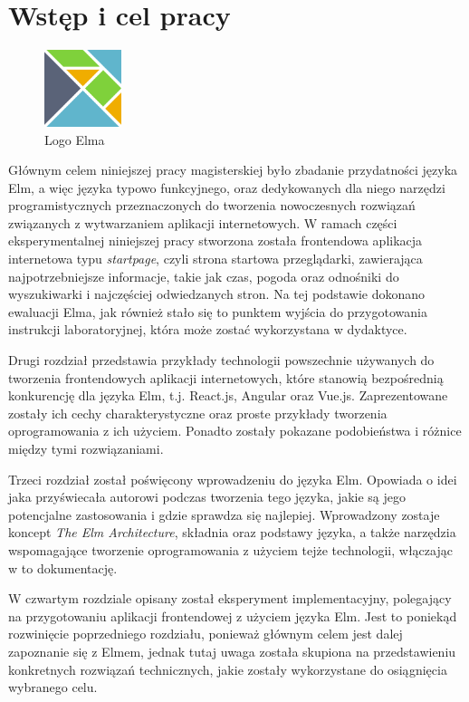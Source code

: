 \documentclass[twoside,a4paper]{report}
\begin{document}
\chapter{Wstęp i cel pracy}
\begin{figure}
    \centering
    \includegraphics[width=0.2\textwidth]{img/elm_logo.png}
    \caption*{Logo Elma}\label{fig:elm_logo}
\end{figure}

Głównym celem niniejszej pracy magisterskiej było zbadanie przydatności języka Elm, a więc języka typowo funkcyjnego, oraz dedykowanych dla niego narzędzi programistycznych przeznaczonych do tworzenia nowoczesnych rozwiązań związanych z wytwarzaniem aplikacji internetowych.
W ramach części eksperymentalnej niniejszej pracy stworzona została frontendowa aplikacja internetowa typu \textit{startpage}, czyli strona startowa przeglądarki, zawierająca najpotrzebniejsze informacje, takie jak czas, pogoda oraz odnośniki do wyszukiwarki i najczęściej odwiedzanych stron. Na tej podstawie dokonano ewaluacji Elma, jak również stało się to punktem wyjścia do przygotowania instrukcji laboratoryjnej, która może zostać wykorzystana w dydaktyce.

Drugi rozdział przedstawia przykłady technologii powszechnie używanych do tworzenia frontendowych aplikacji internetowych, które stanowią bezpośrednią konkurencję dla języka Elm, t.j. React.js, Angular oraz Vue.js.
Zaprezentowane zostały ich cechy charakterystyczne oraz proste przykłady tworzenia oprogramowania z ich użyciem.
Ponadto zostały pokazane podobieństwa i różnice między tymi rozwiązaniami.

Trzeci rozdział został poświęcony wprowadzeniu do języka Elm.
Opowiada o idei jaka przyświecała autorowi podczas tworzenia tego języka, jakie są jego potencjalne zastosowania i gdzie sprawdza się najlepiej.
Wprowadzony zostaje koncept \textit{The Elm Architecture}, składnia oraz podstawy języka, a także narzędzia wspomagające tworzenie oprogramowania z użyciem tejże technologii, włączając w to dokumentację.

W czwartym rozdziale opisany został eksperyment implementacyjny, polegający na przygotowaniu aplikacji frontendowej z użyciem języka Elm.
Jest to poniekąd rozwinięcie poprzedniego rozdziału, ponieważ głównym celem jest dalej zapoznanie się z Elmem, jednak tutaj uwaga została skupiona na przedstawieniu konkretnych rozwiązań technicznych, jakie zostały wykorzystane do osiągnięcia wybranego celu.
\end{document}
